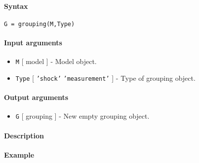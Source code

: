 


	\paragraph{Syntax}\label{syntax}

\begin{verbatim}
G = grouping(M,Type)
\end{verbatim}

\paragraph{Input arguments}\label{input-arguments}

\begin{itemize}
\item
  \texttt{M} {[} model {]} - Model object.
\item
  \texttt{Type} {[} \texttt{'shock'} \textbar{} \texttt{'measurement'}
  {]} - Type of grouping object.
\end{itemize}

\paragraph{Output arguments}\label{output-arguments}

\begin{itemize}
\itemsep1pt\parskip0pt
\item
  \texttt{G} {[} grouping {]} - New empty grouping object.
\end{itemize}

\paragraph{Description}\label{description}

\paragraph{Example}\label{example}


